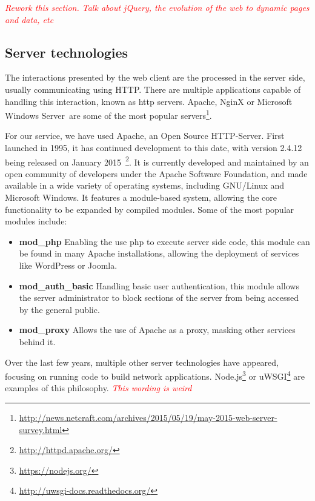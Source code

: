 \emph{\textcolor{red}{Rework this section. Talk about jQuery, the evolution of the web to dynamic pages and data, etc}}


\subsection{Server technologies}


The interactions presented by the web client are the processed in the server side, usually communicating using HTTP. There are multiple applications capable of handling this interaction, known as http servers. Apache, NginX or Microsoft Windows Server\textregistered~are some of the most popular servers\footnote{\url{http://news.netcraft.com/archives/2015/05/19/may-2015-web-server-survey.html}}. 

For our service, we have used Apache\cite{apacheabout}, an Open Source HTTP-Server. First launched in 1995, it has continued development to this date, with version 2.4.12 being released on January 2015~\footnote{\url{http://httpd.apache.org/}}. It is currently developed and maintained by an open community of developers under the Apache Software Foundation, and made available in a wide variety of operating systems, including GNU/Linux and Microsoft Windows\textregistered. It features a module-based system, allowing the core functionality to be expanded by compiled modules. Some of the most popular modules include:

\begin{itemize}[topsep=0pt,itemsep=-1ex,partopsep=1ex,parsep=1ex]
 \item \textbf{mod\_php} Enabling the use php to execute server side code, this module can be found in many Apache installations, allowing the deployment of services like WordPress or Joomla.
 \item \textbf{mod\_auth\_basic} Handling basic user authentication, this module allows the server administrator to block sections of the server from being accessed by the general public.
 \item \textbf{mod\_proxy} Allows the use of Apache as a proxy, masking other services behind it.
\end{itemize}

Over the last few years, multiple other server technologies have appeared, focusing on running code to build network applications. Node.js\footnote{\url{https://nodejs.org/}} or uWSGI\footnote{\url{http://uwsgi-docs.readthedocs.org/}} are examples of this philosophy. \emph{\textcolor{red}{This wording is weird}}


